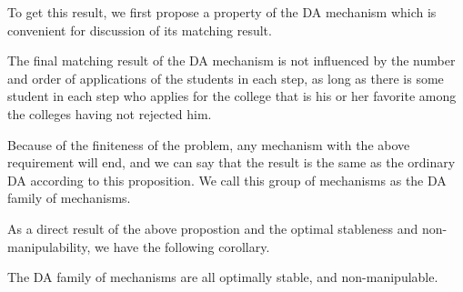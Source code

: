 To get this result, we first propose a property of the DA mechanism which is convenient for discussion of its matching result. 

\begin{prop}
 The final
matching result of the DA mechanism is not influenced by the number and order of applications of the students in each step, as long as there is some student in each step  who applies for the college that is his or her favorite among the colleges having not rejected him.
\end{prop}

Because of the finiteness of the problem, any mechanism with the above requirement will end, and we can say that the result is the same as the ordinary DA according to this  proposition. 
We call this group of mechanisms as the DA family of mechanisms.

As a direct result of the above propostion and the optimal stableness and non-manipulability, we have the following corollary.

\begin{corollary}
The DA family of mechanisms are all optimally stable, and non-manipulable.
\end{corollary}

